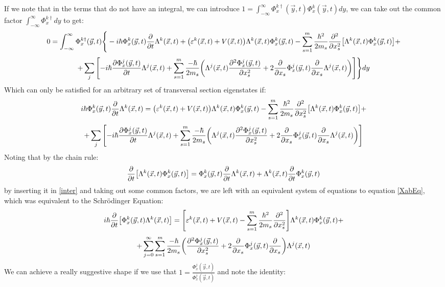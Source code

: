 \documentclass[11pt, a4paper]{article} %
\begin{document}
If we note that in the terms that do not have an integral, we can introduce $1=\int_{-\infty}^\infty \Phi^{k\dagger}_x(\vec{y},t) \Phi^k_x(\vec{y},t)dy$, we can take out the common factor $\int_{-\infty}^\infty\Phi^{k\dagger}_x dy$ to get:
\begin{equation}
0=\int_{-\infty}^\infty\Phi^{k\dagger}_x(\vec{y},t)\Bigg\{ -i\hbar \Phi^k_x(\vec{y},t)\pdv{}{t}\Lambda^k(\vec{x},t)+\qty( \varepsilon^k(\vec{x},t)+V(\vec{x},t) )\Lambda^k(\vec{x},t)\Phi^k_x(\vec{y},t) -\sum_{s=1}^m\frac{\hbar^2}{2m_s}\pdv[2]{}{x_s}\qty[\Lambda^k(\vec{x},t)\Phi^k_x(\vec{y},t) ]+
\end{equation}
$$
+\sum_j\qty[-i\hbar \pdv{\Phi^j_x(\vec{y},t)}{t}\Lambda^j(\vec{x},t)+\sum_{s=1}^m \frac{-\hbar}{2m_s}\qty( \Lambda^j(\vec{x},t)\pdv[2]{\Phi^j_x(\vec{y},t)}{x_s}+2\pdv{}{x_s}\Phi^j_x(\vec{y},t)\pdv{}{x_s}\Lambda^j(\vec{x},t) ) ]\Bigg\}dy
$$
Which can only be satisfied for an arbitrary set of transversal section eigenstates if:
\begin{equation}\label{inter}
 i\hbar \Phi^k_x(\vec{y},t)\pdv{}{t}\Lambda^k(\vec{x},t)=\qty( \varepsilon^k(\vec{x},t)+V(\vec{x},t) )\Lambda^k(\vec{x},t)\Phi^k_x(\vec{y},t) -\sum_{s=1}^m\frac{\hbar^2}{2m_s}\pdv[2]{}{x_s}\qty[\Lambda^k(\vec{x},t)\Phi^k_x(\vec{y},t) ]+
\end{equation}
$$
+\sum_j\qty[-i\hbar \pdv{\Phi^j_x(\vec{y},t)}{t}\Lambda^j(\vec{x},t)+\sum_{s=1}^m \frac{-\hbar}{2m_s}\qty( \Lambda^j(\vec{x},t)\pdv[2]{\Phi^j_x(\vec{y},t)}{x_s}+2\pdv{}{x_s}\Phi^j_x(\vec{y},t)\pdv{}{x_s}\Lambda^j(\vec{x},t) ) ]
$$
Noting that by the chain rule:
\begin{equation}
\pdv{}{t}\qty[\Lambda^k(\vec{x},t)\Phi^k_x(\vec{y},t)]=\Phi^k_x(\vec{y},t)\pdv{}{t}\Lambda^k(\vec{x},t)+\Lambda^k(\vec{x},t)\pdv{}{t}\Phi^k_x(\vec{y},t)
\end{equation}
by inserting it in \eqref{inter} and taking out some common factors, we are left with an equivalent system of equations to equation \eqref{XabEq}, which was equivalent to the Schrödinger Equation:
\begin{equation}\label{inter2}
 i\hbar\pdv{}{t}\qty[ \Phi^k_x(\vec{y},t)\Lambda^k(\vec{x},t)]=\qty[ \varepsilon^k(\vec{x},t)+V(\vec{x},t)  -\sum_{s=1}^m\frac{\hbar^2}{2m_s}\pdv[2]{}{x_s} ]\Lambda^k(\vec{x},t)\Phi^k_x(\vec{y},t)+
\end{equation}
$$
+\sum_{j=0}^\infty\sum_{s=1}^m \frac{-\hbar}{2m_s}\qty( \pdv[2]{\Phi^j_x(\vec{y},t)}{x_s}+2\pdv{}{x_s}\Phi^j_x(\vec{y},t)\pdv{}{x_s} )\Lambda^j(\vec{x},t)
$$
We can achieve a really suggestive shape if we use that $1=\frac{\Phi^j_x(\vec{y},t)}{\Phi^j_x(\vec{y},t)}$ and note the identity:\vspace{-0.2cm}
\end{document}
